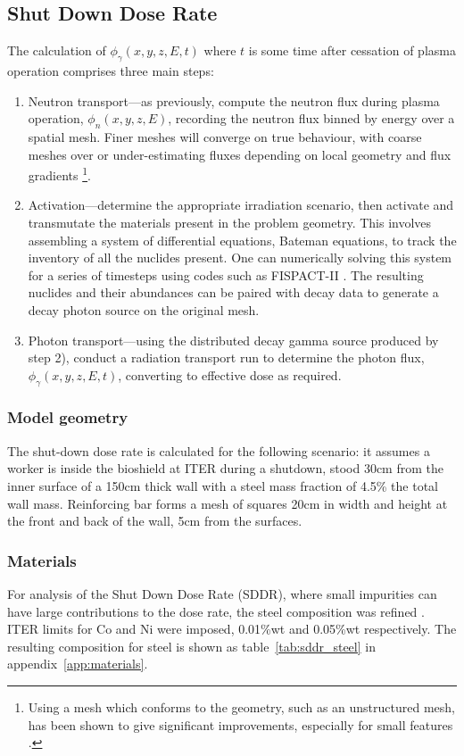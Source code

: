 \subsection{Shut Down Dose Rate}
The calculation of $\phi_{\gamma}(x,y,z,E,t)$ where $t$ is some time after cessation of plasma operation comprises three main steps:
\begin{enumerate}
  \item Neutron transport---as previously, compute the neutron flux during plasma operation, $\phi_{n}(x,y,z,E)$, recording the neutron flux binned by energy over a spatial mesh. Finer meshes will converge on true behaviour, with coarse meshes over or under-estimating fluxes depending on local geometry and flux gradients \footnote{Using a mesh which conforms to the geometry, such as an unstructured mesh, has been shown to give significant improvements, especially for small features \cite{Eade2015}.}.
  \item Activation---determine the appropriate irradiation scenario, then activate and transmutate the materials present in the problem geometry. This involves assembling a system of differential equations, Bateman equations, to track the inventory of all the nuclides present. One can numerically solving this system for a series of timesteps using codes such as FISPACT-II \cite{sublet2017a}. The resulting nuclides and their abundances can be paired with decay data to generate a decay photon source on the original mesh. 
  \item Photon transport---using the distributed decay gamma source produced by step 2), conduct a radiation transport run to determine the photon flux, $\phi_{\gamma}(x,y,z,E,t)$, converting to effective dose as required.
\end{enumerate}

\subsubsection{Model geometry}
The shut-down dose rate is calculated for the following scenario: it assumes a worker is inside the bioshield at ITER during a shutdown, stood 30cm from the inner surface of a 150cm thick wall with a steel mass fraction of 4.5\% the total wall mass. Reinforcing bar forms a mesh of squares 20cm in width and height at the front and back of the wall, 5cm from the surfaces. 

\subsubsection{Materials}
For analysis of the Shut Down Dose Rate (SDDR), where small impurities can have large contributions to the dose rate, the steel composition was refined \cite{Barabash16}. ITER limits for Co and Ni were imposed, 0.01\%wt and 0.05\%wt respectively. The resulting composition for steel is shown as table~\ref{tab:sddr_steel} in appendix~\ref{app:materials}.

